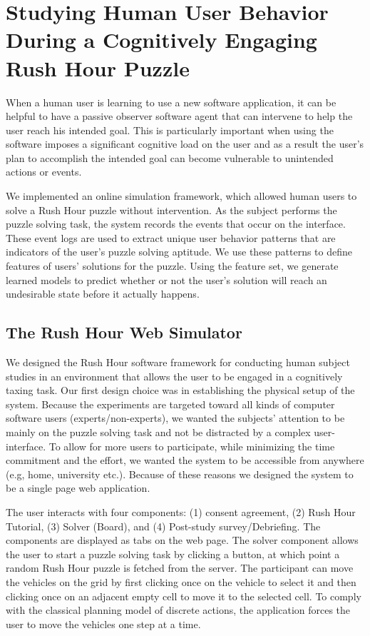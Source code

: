 \section*{Studying Human User Behavior During a Cognitively Engaging Rush Hour Puzzle}
When a human user is learning to use a new software application, it can be helpful to have a passive observer software agent that can intervene to help the user reach his intended goal. This is particularly important when using the software imposes a significant cognitive load on the user and as a result the user's plan to accomplish the intended goal can become vulnerable to unintended actions or events. 

We implemented an online simulation framework, which allowed human users to solve a Rush Hour puzzle without intervention. As the subject performs the puzzle solving task, the system records the events that occur on the interface. These event logs are used to extract unique user behavior patterns that are indicators of the user's puzzle solving aptitude. We use these patterns to define features of users' solutions for the puzzle. Using the feature set, we generate learned models to predict whether or not the user's solution will reach an undesirable state before it actually happens. 





\subsection*{The Rush Hour Web Simulator}
We designed the Rush Hour software framework for conducting human subject studies in an environment that allows the user to be engaged in a cognitively taxing task. Our first design choice was in establishing the physical setup of the system. Because the experiments are targeted toward all kinds of computer software users (experts/non-experts), we wanted the subjects' attention to be mainly on the puzzle solving task and not be distracted by a complex user-interface. To allow for more users to participate, while minimizing the time commitment and the effort, we wanted the system to be accessible from anywhere (e.g, home, university etc.). Because of these reasons we designed the system to be a single page web application.

The user interacts with four components: (1) consent agreement, (2) Rush Hour Tutorial, (3) Solver (Board), and (4) Post-study survey/Debriefing. The components are displayed as tabs on the web page.
The solver component allows the user to start a puzzle solving task by clicking a button, at which point a random Rush Hour puzzle is fetched from the server. The participant can move the vehicles on the grid by first clicking once on the vehicle to select it and then clicking once on an adjacent empty cell to move it to the selected cell. To comply with the classical planning model of discrete actions, the application forces the user to move the vehicles one step at a time. 

